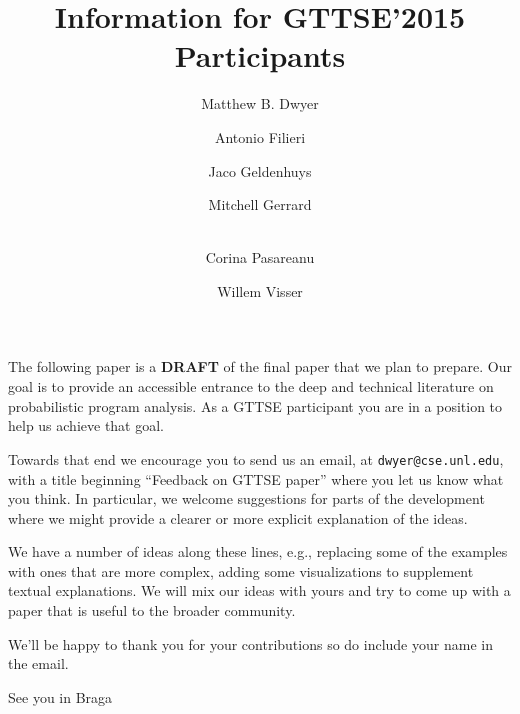 \documentclass[runningheads,a4paper]{llncs}
\begin{document}
\newcommand{\mycomment}[1]{\textit{\textcolor{red}{#1}}}
\newcommand{\ignore}[1]{}

\title{Information for GTTSE'2015 Participants}

\author{Matthew B. Dwyer
\and Antonio Filieri\and Jaco Geldenhuys\and Mitchell Gerrard\and\\
Corina Pasareanu\and Willem Visser}
%

\maketitle

The following paper is a \textbf{DRAFT} of the final paper that we
plan to prepare.  Our goal is to provide an accessible entrance to the
deep and technical literature on probabilistic program analysis.
As a GTTSE participant you are in a position to help us achieve that
goal.

Towards that end we encourage you to send us an email, at
\texttt{dwyer@cse.unl.edu}, with a title beginning ``Feedback on
GTTSE paper'' where you let us know what you think.
In particular, we welcome suggestions for parts of the development
where we might provide a clearer or more explicit explanation of
the ideas.  

We have a number of ideas along these lines, e.g., replacing some
of the examples with ones that are more complex, adding some visualizations
to supplement textual explanations.   We will mix our ideas with yours
and try to come up with a paper that is useful to the broader community.

We'll be happy to thank you for your contributions so do include your
name in the email.

See you in Braga
\end{document}
